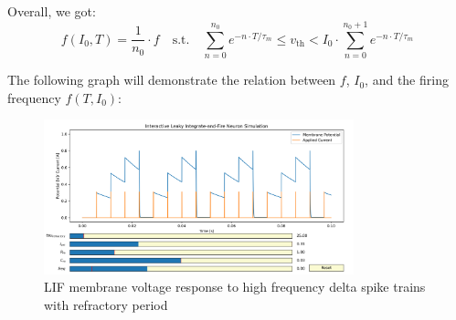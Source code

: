 Overall, we got:
\begin{equation}
f(I_0, T) = \frac{1}{n_0} \cdot f \quad \text{s.t.} \quad \sum_{n=0}^{n_0} e^{-n \cdot T/\tau_m} \leq v_{\text{th}} < I_0 \cdot \sum_{n=0}^{n_0+1} e^{-n \cdot T/\tau_m}
\end{equation}

The following graph will demonstrate the relation between \(f\), \(I_0\), and the firing frequency \(f(T, I_0)\):

\begin{figure}[H]
    \centering
    \includegraphics[width=0.8\textwidth]{methods/computational-models/graphs/LIF-high-freq-spike-response-ref-final.png}
    \caption{LIF membrane voltage response to high frequency delta spike trains with refractory period}
    \label{fig:LIF-high-freq-spike-ref-final}
\end{figure}
